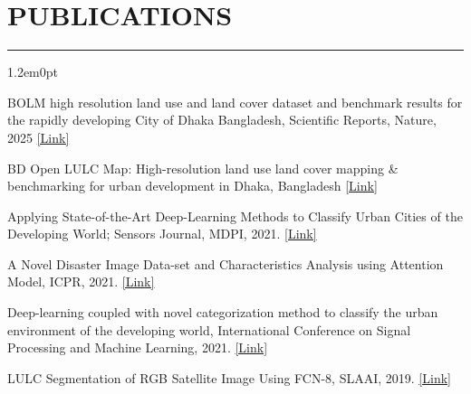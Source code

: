\documentclass[a4paper,10pt]{article}
\begin{document}
\section*{PUBLICATIONS}
\hrule\vspace{0.6em}

\begin{adjustwidth}{1.2em}{0pt}

\vspace{0.1em}

BOLM high resolution land use and land cover dataset and benchmark results for the rapidly developing City of Dhaka Bangladesh, Scientific Reports, Nature, 2025 \textcolor{theme_link}{\href{https://doi.org/10.1038/s41598-025-21458-9}{[Link]}}

\vspace{0.1em}

BD Open LULC Map: High-resolution land use land cover mapping \& benchmarking for urban development in Dhaka, Bangladesh \textcolor{theme_link}{\href{https://arxiv.org/pdf/2505.21915}{[Link]}}

\vspace{0.1em}

Applying State-of-the-Art Deep-Learning Methods to Classify Urban Cities of the Developing World; Sensors Journal, MDPI, 2021. \textcolor{theme_link}{\href{https://doi.org/10.3390/s21227469}{[Link]}}

\vspace{0.1em}

A Novel Disaster Image Data-set and Characteristics Analysis using Attention Model, ICPR, 2021.
\textcolor{theme_link}{\href{https://doi.org/10.48550/arXiv.2107.01284}{[Link]}}

\vspace{0.1em}

Deep-learning coupled with novel categorization method to classify the urban environment of the developing world, International Conference on Signal Processing and Machine Learning, 2021.
\textcolor{theme_link}{\href{https://doi.org/10.48550/arXiv.2011.12847}{[Link]}}

\vspace{0.1em}

LULC Segmentation of RGB Satellite Image Using FCN-8, SLAAI, 2019.
\textcolor{theme_link}{\href{https://doi.org/10.48550/arXiv.2008.10736}{[Link]}}
\end{adjustwidth}
\end{document}
